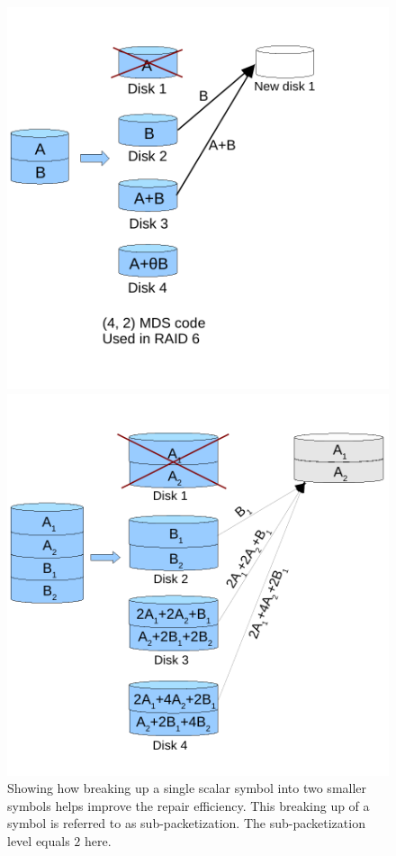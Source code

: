 	\begin{figure}[!h]
			\begin{minipage}[t]{0.4\textwidth}
				\includegraphics[scale=.6]{src/Figures/chap4/fig_RAID2}
			\end{minipage}
			\hspace*{0.75in}
			\begin{minipage}[t]{0.4\textwidth}
				\includegraphics[scale=.6]{src/Figures/chap4/fig_vector_illustration2}
			\end{minipage}
		\caption{Showing how breaking up a single scalar symbol into two smaller symbols helps improve the repair efficiency. This breaking up of a symbol is referred to as sub-packetization.  The sub-packetization level equals $2$ here.} \label{fig:vectorize}
	\end{figure}

